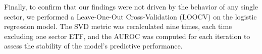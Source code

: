 \documentclass[]{article}
\begin{document}
Finally, to confirm that our findings were not driven by the behavior of any single sector, we performed a Leave-One-Out Cross-Validation (LOOCV) on the logistic regression model. The SVD metric was recalculated nine times, each time excluding one sector ETF, and the AUROC was computed for each iteration to assess the stability of the model's predictive performance.
\end{document}
